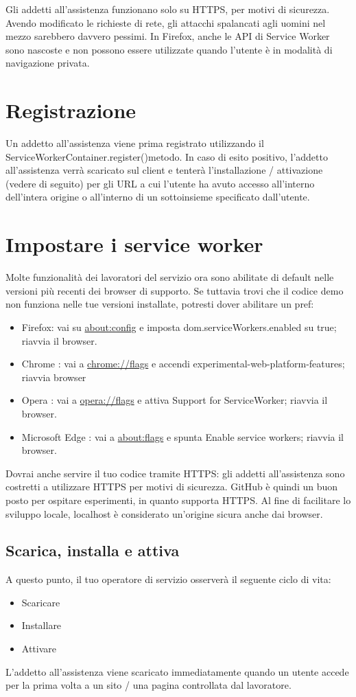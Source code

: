 \documentclass[italian]{article}
\begin{document}
Gli addetti all'assistenza funzionano solo su HTTPS, per motivi di sicurezza. Avendo modificato le richieste di rete, gli attacchi spalancati agli uomini nel mezzo sarebbero davvero pessimi. In Firefox, anche le API di Service Worker sono nascoste e non possono essere utilizzate quando l'utente è in modalità di navigazione privata.

\section{Registrazione}
Un addetto all'assistenza viene prima registrato utilizzando il ServiceWorkerContainer.register()metodo. In caso di esito positivo, l'addetto all'assistenza verrà scaricato sul client e tenterà l'installazione / attivazione (vedere di seguito) per gli URL a cui l'utente ha avuto accesso all'interno dell'intera origine o all'interno di un sottoinsieme specificato dall'utente.

\section{Impostare i service worker}
Molte funzionalità dei lavoratori del servizio ora sono abilitate di default nelle versioni più recenti dei browser di supporto. Se tuttavia trovi che il codice demo non funziona nelle tue versioni installate, potresti dover abilitare un pref:
\begin{itemize}
\item Firefox: vai su \url{about:config} e imposta  dom.serviceWorkers.enabled su true; riavvia il browser.
\item Chrome : vai a  \url{chrome://flags} e accendi  experimental-web-platform-features; riavvia browser
\item Opera : vai a \url{opera://flags} e attiva  Support for ServiceWorker; riavvia il browser.
\item Microsoft Edge : vai a  \url{about:flags} e spunta  Enable service workers; riavvia il browser.
\end{itemize}
Dovrai anche servire il tuo codice tramite HTTPS: gli addetti all'assistenza sono costretti a utilizzare HTTPS per motivi di sicurezza. GitHub è quindi un buon posto per ospitare esperimenti, in quanto supporta HTTPS. Al fine di facilitare lo sviluppo locale,  localhost è considerato un'origine sicura anche dai browser.


\subsection{Scarica, installa e attiva}
A questo punto, il tuo operatore di servizio osserverà il seguente ciclo di vita:
\begin{itemize}
\item Scaricare
\item Installare
\item Attivare
\end{itemize}
L'addetto all'assistenza viene scaricato immediatamente quando un utente accede per la prima volta a un sito / una pagina controllata dal lavoratore.
\end{document}
